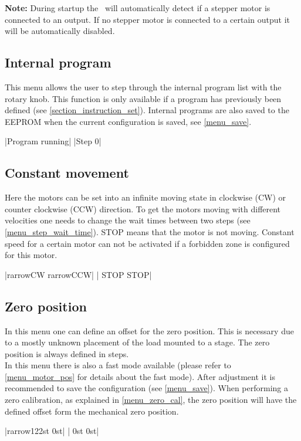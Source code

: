 \textbf{Note:} During startup the \productName ~will automatically detect if a stepper motor is connected to an output. If no stepper motor is connected to a certain output it will be automatically disabled.

\subsection{Internal program}
This menu allows the user to step through the internal program list with the rotary knob.
This function is only available if a program has previously been defined (see \ref{section_instruction_set}).
Internal programs are also saved to the EEPROM when the current configuration is saved, see \ref{menu_save}.
\begin{center}
  |Program running|
             |Step 0|
\end{center}

\subsection{Constant movement}
Here the motors can be set into an infinite moving state in clockwise (CW) or counter clockwise (CCW) direction. To get the motors moving with different velocities one needs to change the wait times between two steps (see \ref{menu_step_wait_time}).
STOP means that the motor is not moving. Constant speed for a certain motor can not be activated if a forbidden zone is configured for this motor.
\begin{center}
  |{rarrow}CW     {rarrow}CCW|
             | STOP    STOP|
\end{center}

\subsection{Zero position}
In this menu one can define an offset for the zero position. This is necessary due to a mostly unknown placement of the load mounted to a stage. 
The zero position is always defined in steps.\\ 
In this menu there is also a fast mode available (please refer to  \ref{menu_motor_pos} for details about the fast mode). After adjustment it is recommended to save the configuration (see \ref{menu_save}). When performing a zero calibration, as explained in \ref{menu_zero_cal}, the zero position will have the defined offset form the mechanical zero position.
\begin{center}
  |{rarrow}122st   0st|
             | 0st     0st|
\end{center}

